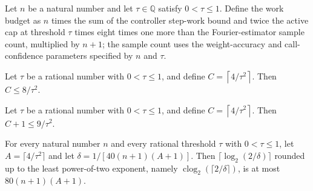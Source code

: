 \begin{definition}
\label{FABL.goldreichLevinWorkBudget}
\leanok
{}
Let $n$ be a natural number and let $\tau\in\mathbb{Q}$ satisfy $0<\tau\leq 1$. Define
the work budget as $n$ times the sum of the controller step-work bound and twice the
active cap at threshold $\tau$ times eight times one more than the Fourier-estimator
sample count, multiplied by $n+1$; the sample count uses the weight-accuracy and
call-confidence parameters specified by $n$ and $\tau$.
\end{definition}

\begin{theorem}
\label{FABL.goldreichLevinActiveCap_cast_le}
\leanok
{}
Let $\tau$ be a rational number with $0<\tau\le 1$, and define $C=\left\lceil
4/\tau^2\right\rceil$. Then $C\le 8/\tau^2$.
\end{theorem}

\begin{theorem}
\label{FABL.goldreichLevinActiveCap_add_one_cast_le}
\leanok
{}
Let $\tau$ be a rational number with $0<\tau\le 1$, and define $C=\left\lceil
4/\tau^2\right\rceil$. Then $C+1\le 9/\tau^2$.
\end{theorem}

\begin{theorem}
\label{FABL.goldreichLevinCallConfidence_failureBits_le}
\leanok
{}
For every natural number $n$ and every rational threshold $\tau$ with $0<\tau\le 1$, let
$A=\lceil 4/\tau^2\rceil$ and let $\delta=1/[40(n+1)(A+1)]$. Then
$\lceil\log_2(2/\delta)\rceil$ rounded up to the least power-of-two exponent, namely
$\operatorname{clog}_2(\lceil 2/\delta\rceil)$, is at most $80(n+1)(A+1)$.
\end{theorem}

